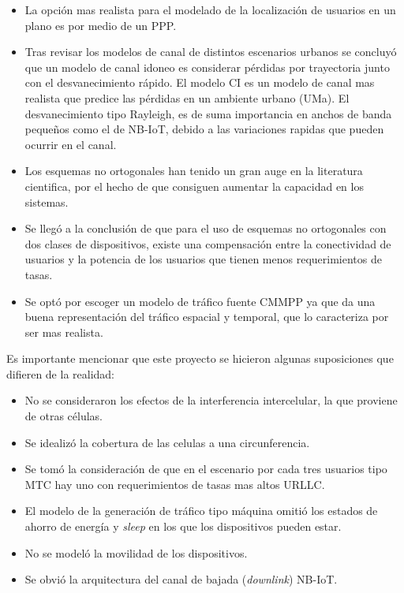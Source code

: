 \begin{itemize}
    \item La opción mas realista para el modelado de la localización de usuarios en un plano es por medio de un PPP.
    \item Tras revisar los modelos de canal de distintos escenarios urbanos se concluyó que un modelo de canal idoneo es considerar pérdidas por trayectoria junto con el desvanecimiento rápido.  El modelo CI es un modelo de canal mas realista que predice las pérdidas en un ambiente urbano (UMa). El desvanecimiento tipo Rayleigh, es de suma importancia en anchos de banda pequeños como el de NB-IoT, debido a las variaciones rapidas que pueden ocurrir en el canal.
    \item Los esquemas no ortogonales han tenido un gran auge en la literatura cientifica, por el hecho de que consiguen aumentar la capacidad en los sistemas.
    \item Se llegó a la conclusión de que para el uso de esquemas no ortogonales con dos clases de dispositivos, existe una compensación entre la conectividad de usuarios y la potencia de los usuarios que tienen menos requerimientos de tasas.
    \item Se optó por escoger un modelo de tráfico fuente CMMPP ya que da una buena representación del tráfico espacial y temporal, que lo caracteriza por ser mas realista.
\end{itemize}


Es importante mencionar que este proyecto se hicieron algunas suposiciones que  difieren de la realidad:
\begin{itemize}
    \item No se consideraron los efectos de la interferencia intercelular, la que proviene de otras células. 
    \item Se idealizó la cobertura de las celulas a una circunferencia.
    \item Se tomó la consideración de que en el escenario por cada tres usuarios tipo MTC hay uno con requerimientos de tasas mas altos URLLC.
    \item El modelo de la generación de tráfico tipo máquina omitió los estados de ahorro de energía y \textit{sleep} en los que los dispositivos pueden estar.
    \item No se modeló la movilidad de los dispositivos.
    \item Se obvió la arquitectura del canal de bajada (\textit{downlink}) NB-IoT.
\end{itemize}

